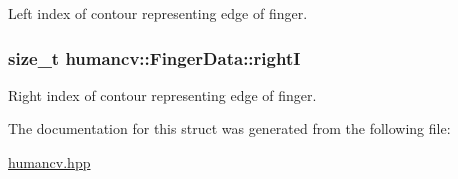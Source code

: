 Left index of contour representing edge of finger. 

\hypertarget{structhumancv_1_1_finger_data_a00ef4dc86d46d741a289e61dcf396bb3}{
\subsubsection[{right\-I}]{\setlength{\rightskip}{0pt plus 5cm}size\-\_\-t {\bf humancv\-::\-Finger\-Data\-::right\-I}}}\label{structhumancv_1_1_finger_data_a00ef4dc86d46d741a289e61dcf396bb3}


Right index of contour representing edge of finger. 



The documentation for this struct was generated from the following file\-:\begin{DoxyCompactItemize}
\item 
\hyperlink{humancv_8hpp}{humancv.\-hpp}\end{DoxyCompactItemize}
